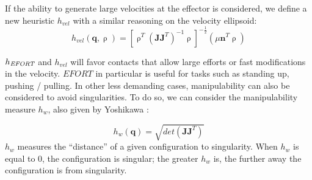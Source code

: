 If the ability to generate large velocities at the effector is considered, we define a new heuristic $h_{vel}$ with a similar reasoning on the velocity ellipsoid:
\begin{equation}
h_{vel}(\mathbf{q}, \uprho) = [\uprho^{T}(\mathbf{J}\mathbf{J}^T)^{-1}\uprho]^{-\frac{1}{2}} ( \mu \mathbf{n}^T \uprho)
\end{equation}

$h_{\textrm{\it EFORT}}$ and $h_{vel}$ will favor contacts that allow large efforts or fast modifications in the velocity.
$EFORT$ in particular is useful for tasks such as standing up, pushing / pulling.
In other less demanding cases, manipulability can also be considered to avoid singularities.
To do so, we can consider the manipulability measure $h_{w}$, also given by Yoshikawa \citeauthor{Yoshikawa1984}:

\begin{equation} \label{ellipsoid}
h_{w}(\mathbf{q}) = \sqrt{det(\mathbf{J}\mathbf{J}^T)}
\end{equation}
$h_{w}$ measures the ``distance'' of a given configuration to singularity. When $h_{w}$ is equal to 0, the configuration is singular;
the greater $h_{w}$ is, the further away the configuration is from singularity.










